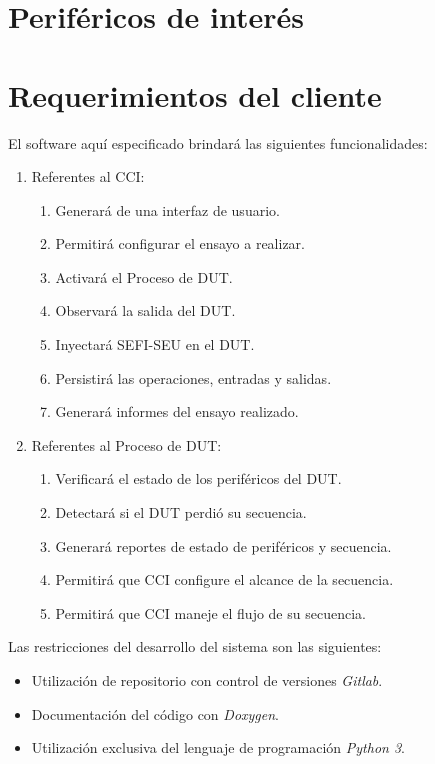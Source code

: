 \section{Periféricos de interés}
\label{sec:perifericos}

\section{Requerimientos del cliente}
\label{sec:emphuerimientos}

El software aquí especificado brindará las siguientes funcionalidades:

\begin{enumerate}
	\item Referentes al CCI:
		\begin{enumerate}
			\item Generará de una interfaz de usuario.
			\item Permitirá configurar el ensayo a realizar.
			\item Activará el Proceso de DUT.
			\item Observará la salida del DUT.
			\item Inyectará SEFI-SEU en el DUT.
			\item Persistirá las operaciones, entradas y salidas.
			\item Generará informes del ensayo realizado.
		\end{enumerate}
	\item Referentes al Proceso de DUT:
		\begin{enumerate}
			\item Verificará el estado de los periféricos del DUT.
			\item Detectará si el DUT perdió su secuencia.
			\item Generará reportes de estado de periféricos y secuencia.
			\item Permitirá que CCI configure el alcance de la secuencia.
			\item Permitirá que CCI maneje el flujo de su secuencia.
		\end{enumerate}
\end{enumerate}

Las restricciones del desarrollo del sistema son las siguientes:

\begin{itemize}
	\item Utilización de repositorio con control de versiones \emph{Gitlab}.
	\item Documentación del código con \emph{Doxygen}.
	\item Utilización exclusiva del lenguaje de programación \emph{Python 3}.
\end{itemize}

